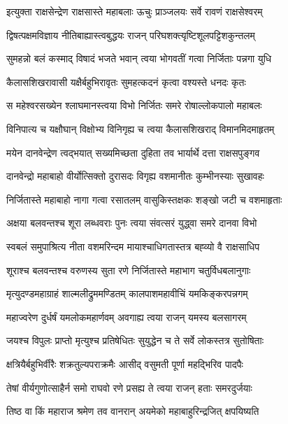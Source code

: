 
\twolineshloka
{इत्युक्ता राक्षसेन्द्रेण राक्षसास्ते महाबलाः}
{ऊचुः प्राञ्जलयः सर्वे रावणं राक्षसेश्वरम्} %

\twolineshloka
{द्विषत्पक्षमविज्ञाय नीतिबाह्यास्त्वबुद्धयः}
{राजन् परिघशक्त्यृष्टिशूलपट्टिशकुन्तलम्} %

\twolineshloka
{सुमहन्नो बलं कस्माद् विषादं भजते भवान्}
{त्वया भोगवतीं गत्वा निर्जिताः पन्नगा युधि} %

\twolineshloka
{कैलासशिखरावासी यक्षैर्बहुभिरावृतः}
{सुमहत्कदनं कृत्वा वश्यस्ते धनदः कृतः} %

\twolineshloka
{स महेश्वरसख्येन श्लाघमानस्त्वया विभो}
{निर्जितः समरे रोषाल्लोकपालो महाबलः} %

\twolineshloka
{विनिपात्य च यक्षौघान् विक्षोभ्य विनिगृह्य च}
{त्वया कैलासशिखराद् विमानमिदमाहृतम्} %

\twolineshloka
{मयेन दानवेन्द्रेण त्वद्भयात् सख्यमिच्छता}
{दुहिता तव भार्यार्थे दत्ता राक्षसपुङ्गव} %

\twolineshloka
{दानवेन्द्रो महाबाहो वीर्योत्सिक्तो दुरासदः}
{विगृह्य वशमानीतः कुम्भीनस्याः सुखावहः} %

\twolineshloka
{निर्जितास्ते महाबाहो नागा गत्वा रसातलम्}
{वासुकिस्तक्षकः शङ्खो जटी च वशमाहृताः} %

\twolineshloka
{अक्षया बलवन्तश्च शूरा लब्धवराः पुनः}
{त्वया संवत्सरं युद्ध्वा समरे दानवा विभो} %

\twolineshloka
{स्वबलं समुपाश्रित्य नीता वशमरिन्दम}
{मायाश्चाधिगतास्तत्र बह्व्यो वै राक्षसाधिप} %

\twolineshloka
{शूराश्च बलवन्तश्च वरुणस्य सुता रणे}
{निर्जितास्ते महाभाग चतुर्विधबलानुगाः} %

\twolineshloka
{मृत्युदण्डमहाग्राहं शाल्मलीद्रुममण्डितम्}
{कालपाशमहावीचिं यमकिङ्करपन्नगम्} %

\twolineshloka
{महाज्वरेण दुर्धर्षं यमलोकमहार्णवम्}
{अवगाह्य त्वया राजन् यमस्य बलसागरम्} %

\twolineshloka
{जयश्च विपुलः प्राप्तो मृत्युश्च प्रतिषेधितः}
{सुयुद्धेन च ते सर्वे लोकस्तत्र सुतोषिताः} %

\twolineshloka
{क्षत्रियैर्बहुभिर्वीरैः शक्रतुल्यपराक्रमैः}
{आसीद् वसुमती पूर्णा महद्भिरिव पादपैः} %

\twolineshloka
{तेषां वीर्यगुणोत्साहैर्न समो राघवो रणे}
{प्रसह्य ते त्वया राजन् हताः समरदुर्जयाः} %

\twolineshloka
{तिष्ठ वा किं महाराज श्रमेण तव वानरान्}
{अयमेको महाबाहुरिन्द्रजित् क्षपयिष्यति} %

